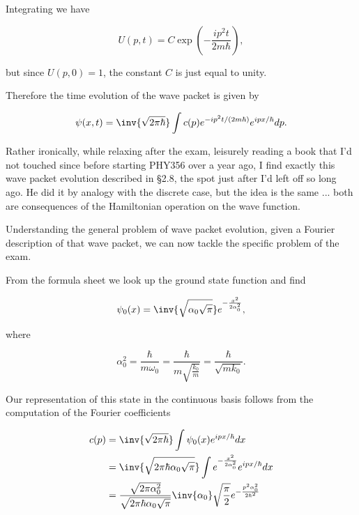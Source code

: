 Integrating we have

\begin{equation}\label{eqn:qmTwoExamReflection:210}
U(p, t) = C \exp\left( -\frac{i p^2 t}{2m \hbar} \right),
\end{equation}

but since $U(p, 0) = 1$, the constant $C$ is just equal to unity.

Therefore the time evolution of the wave packet is given by

\begin{equation}\label{eqn:qmTwoExamReflection:230}
\psi(x, t) = \inv{\sqrt{2 \pi \hbar}} \int c(p) e^{-i p^2 t/(2m \hbar)} e^{i p x/\hbar} dp.
\end{equation}

Rather ironically, while relaxing after the exam, leisurely reading a book \cite{pauli2000wm} that I'd not touched since before starting PHY356 over a year ago, I find exactly this wave packet evolution described in \S 2.8, the spot just after I'd left off so long ago.  He did it by analogy with the discrete case, but the idea is the same ... both are consequences of the Hamiltonian operation on the wave function.

Understanding the general problem of wave packet evolution, given a Fourier description of that wave packet, we can now tackle the specific problem of the exam.

From the formula sheet we look up the ground state function and find

\begin{equation}\label{eqn:qmTwoExamReflection:250}
\psi_0(x) = \inv{\sqrt{\alpha_0 \sqrt{\pi}}} e^{-\frac{x^2}{2\alpha_0^2}},
\end{equation}

where

\begin{equation}\label{eqn:qmTwoExamReflection:270}
\alpha_0^2 
= \frac{\hbar}{m \omega_0}  
= \frac{\hbar}{m \sqrt{\frac{k_0}{m}}}  
= \frac{\hbar}{\sqrt{m k_0}}.
\end{equation}

Our representation of this state in the continuous basis follows from the computation of the Fourier coefficients

\begin{align*}
c(p) 
&= 
\inv{\sqrt{2 \pi \hbar}} \int \psi_0(x) e^{i p x/\hbar} dx \\
&= 
\inv{\sqrt{2 \pi \hbar \alpha_0 \sqrt{\pi}}} 
\int 
e^{-\frac{x^2}{2\alpha_0^2}}
e^{i p x/\hbar} dx \\
&=
\frac{\sqrt{2 \pi \alpha_0^2}}{\sqrt{2 \pi \hbar \alpha_0 \sqrt{\pi}}} 
\inv{\alpha_0} \sqrt{\frac{\pi}{2}}
e^{-\frac{p^2 \alpha_0^2}{2 \hbar^2}} \\
\end{align*}

